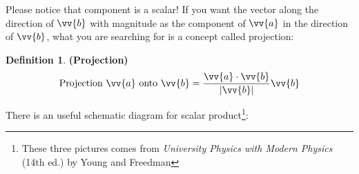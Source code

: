 \documentclass[12pt, a4paper, reqno]{amsart}
\theoremstyle{definition}
\newtheorem{definition}[theorem]{Definition} %
\numberwithin{equation}{section} %
\begin{document}
Please notice that component is a scalar! If you want the vector along the direction of $\vv{b}$ with magnitude as the component of $\vv{a}$ in the direction of $\vv{b}$, what you are searching for is a concept called projection:
\begin{definition}\label{D:PRJ} \textbf{(Projection)}
	\begin{equation}\label{E:Projection}
		\text{Projection $\vv{a}$ onto $\vv{b}$} = \frac{\vv{a}\cdot \vv{b}}{\left|\vv{b}\right|}\vv{b}
	\end{equation}
\end{definition}

There is an useful schematic diagram for scalar product\footnote{These three pictures comes from \textit{University Physics with Modern Physics} (14th ed.) by Young and Freedman}\label{f:AA}:
\end{document}
